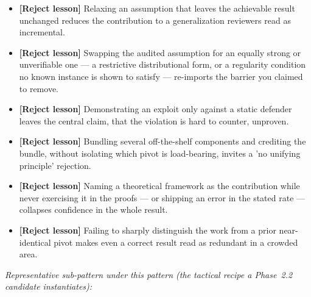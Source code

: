 \begin{tcolorbox}
\begin{itemize}[leftmargin=12pt,topsep=2pt,itemsep=1pt]
  \item \textbf{[Reject lesson]} Relaxing an assumption that leaves the achievable result unchanged reduces the contribution to a generalization reviewers read as incremental.
  \item \textbf{[Reject lesson]} Swapping the audited assumption for an equally strong or unverifiable one --- a restrictive distributional form, or a regularity condition no known instance is shown to satisfy --- re-imports the barrier you claimed to remove.
  \item \textbf{[Reject lesson]} Demonstrating an exploit only against a static defender leaves the central claim, that the violation is hard to counter, unproven.
  \item \textbf{[Reject lesson]} Bundling several off-the-shelf components and crediting the bundle, without isolating which pivot is load-bearing, invites a 'no unifying principle' rejection.
  \item \textbf{[Reject lesson]} Naming a theoretical framework as the contribution while never exercising it in the proofs --- or shipping an error in the stated rate --- collapses confidence in the whole result.
  \item \textbf{[Reject lesson]} Failing to sharply distinguish the work from a prior near-identical pivot makes even a correct result read as redundant in a crowded area.
\end{itemize}
\end{tcolorbox}

\noindent\textit{Representative sub-pattern under this pattern (the tactical recipe a Phase~2.2 candidate instantiates):}

